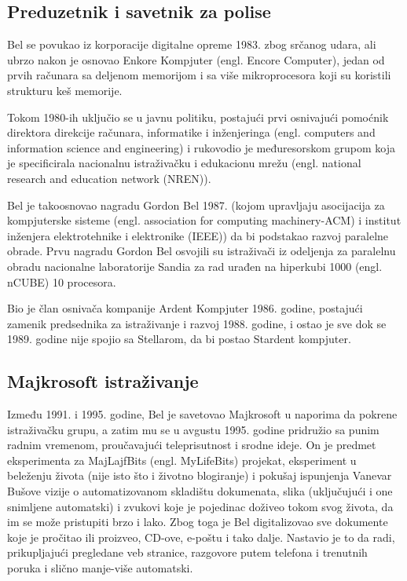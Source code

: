 \documentclass[a4paper]{article}
\begin{document}
{\subsection{Preduzetnik i savetnik za polise}
\label{subsec:podnaslov1}
Bel se povukao iz korporacije digitalne opreme 1983. zbog srčanog udara, ali ubrzo nakon je osnovao Enkore Kompjuter (engl. Encore Computer), jedan od prvih računara sa deljenom memorijom i sa više mikroprocesora koji su koristili strukturu keš memorije.

Tokom 1980-ih uključio se u javnu politiku, postajući prvi osnivajući pomoćnik direktora direkcije računara, informatike i inženjeringa (engl. computers and information science and engineering) i rukovodio je \-me\-đu\-re\-so\-rskom grupom koja je specificirala nacionalnu istraživačku i edukacionu mrežu (engl. national research and education network (NREN)).

Bel je tako\dje osnovao nagradu Gordon Bel 1987. (kojom upravljaju asocijacija za kompjuterske sisteme (engl. association for computing \-ma\-chi\-ne\-ry-ACM) i institut inženjera elektrotehnike i elektronike (IEEE)) da bi podstakao razvoj paralelne obrade. Prvu nagradu Gordon Bel osvojili su istraživači iz odeljenja za paralelnu obradu nacionalne laboratorije Sandia za rad urađen na hiperkubi 1000 (engl. nCUBE) 10 procesora.

Bio je član osnivača kompanije Ardent Kompjuter 1986. godine, postajući zamenik predsednika za istraživanje i razvoj 1988. godine, i ostao je sve dok se 1989. godine nije spojio sa Stellarom, da bi postao Stardent kompjuter.
\subsection{Majkrosoft istraživanje}
\label{subsec:podnaslov1}
Između 1991. i 1995. godine, Bel je savetovao Majkrosoft u naporima da pokrene istraživačku grupu, a zatim mu se u avgustu 1995. godine pridružio sa punim radnim vremenom, proučavajući teleprisutnost i srodne ideje. On je predmet eksperimenta za MajLajfBits (engl. MyLifeBits) projekat, eksperiment u beleženju života (nije isto što i životno blogiranje) i pokušaj ispunjenja Vanevar Bušove vizije o automatizovanom skladištu dokumenata, slika (uključujući i one snimljene automatski) i zvukovi koje je pojedinac doživeo tokom svog života, da im se može pristupiti brzo i lako. Zbog toga je Bel digitalizovao sve dokumente koje je pročitao ili proizveo, CD-ove, e-poštu i tako dalje. Nastavio je to da radi, prikupljajući pregledane veb stranice, razgovore putem telefona i trenutnih poruka i slično manje-više automatski.

}
\end{document}
